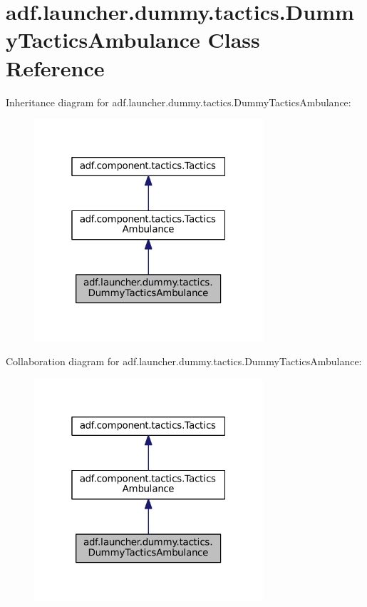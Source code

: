 \hypertarget{classadf_1_1launcher_1_1dummy_1_1tactics_1_1DummyTacticsAmbulance}{}\section{adf.\+launcher.\+dummy.\+tactics.\+Dummy\+Tactics\+Ambulance Class Reference}
\label{classadf_1_1launcher_1_1dummy_1_1tactics_1_1DummyTacticsAmbulance}


Inheritance diagram for adf.\+launcher.\+dummy.\+tactics.\+Dummy\+Tactics\+Ambulance\+:
\nopagebreak
\begin{figure}[H]
\begin{center}
\leavevmode
\includegraphics[width=241pt]{classadf_1_1launcher_1_1dummy_1_1tactics_1_1DummyTacticsAmbulance__inherit__graph}
\end{center}
\end{figure}


Collaboration diagram for adf.\+launcher.\+dummy.\+tactics.\+Dummy\+Tactics\+Ambulance\+:
\nopagebreak
\begin{figure}[H]
\begin{center}
\leavevmode
\includegraphics[width=241pt]{classadf_1_1launcher_1_1dummy_1_1tactics_1_1DummyTacticsAmbulance__coll__graph}
\end{center}
\end{figure}
